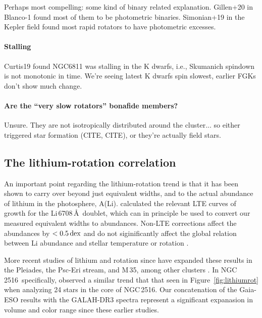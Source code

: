 \documentclass[12pt,twocolumn,tighten]{aastex63}
\newcommand{\cn}{NGC\,2516} %
\begin{document}
  Perhaps most compelling: some kind of binary related explanation.
  Gillen+20 in Blanco-1 found most of them to be photometric binaries.
  Simonian+19 in the Kepler field found most rapid rotators to have
  photometric excesses.


  \paragraph{Stalling}
  Curtis19 found NGC6811 was stalling in the K dwarfs, i.e., Skumanich
  spindown is not monotonic in time.
  We're seeing latest K dwarfs spin slowest, earlier FGKs don't show
  much change.


  \paragraph{Are the ``very slow rotators'' bonafide members?}
  Unsure. They are not isotropically distributed around the
  cluster... so either triggered star formation (CITE, CITE), or they're
  actually field stars.


\subsection{The lithium-rotation correlation}
\label{discussion:lithium}

An important point regarding the lithium-rotation trend is that it has
been shown to carry over beyond just equivalent widths, and to the
actual abundance of lithium in the photosphere, A(Li).
\citet{soderblom_evolution_1993} calculated the relevant LTE curves of
growth for the Li\,6708\,\AA\ doublet, which can in principle be used to
convert our measured equivalent widths to abundances.  Non-LTE
corrections affect the abundances by $<0.5\,{\rm dex}$ and do not
siginificantly affect the global relation between Li abundance and
stellar temperature or rotation
\citep{carlsson_1994,lind_departures_2009}.

More recent studies of lithium and rotation since 
\citet{soderblom_evolution_1993} have expanded these results in the
Pleiades, the Psc-Eri stream, and M\,35, among other clusters
\citep{bouvier_pleiades_lirot_2018,arancibia_2020,jeffries_m35_li_2020}.
In \cn\ specifically, \citet{jeffries_rotation_1998} observed a
similar trend that that seen in Figure~\ref{fig:lithiumrot} when
analyzing 24 stars in the core of \cn.  Our concatenation of the
\citet{randich_gaiaeso_2018} Gaia-ESO results with the GALAH-DR3
spectra represent a significant expanasion in volume and color range
since these earlier studies.
\end{document}
